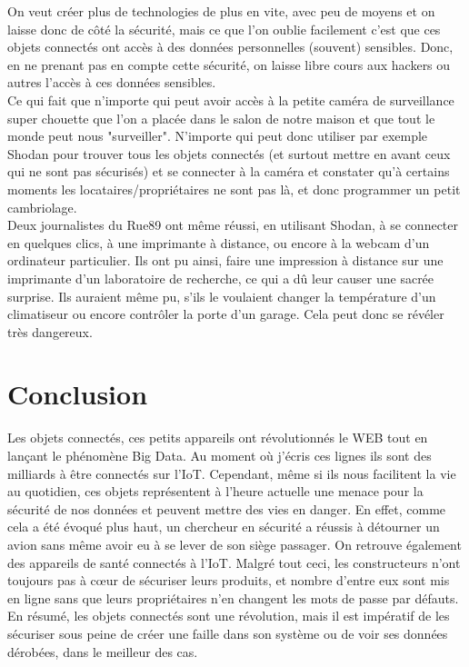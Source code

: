 \documentclass[a4paper]{report}
\begin{document}
	On veut créer plus de technologies de plus en vite, avec peu de moyens et on laisse donc de côté la sécurité, mais ce que l'on oublie facilement c'est que ces objets connectés ont accès à des données personnelles (souvent) sensibles. Donc, en ne prenant pas en compte cette sécurité, on laisse libre cours aux hackers ou autres l'accès à ces données sensibles. \\ 
	
	Ce qui fait que n'importe qui peut avoir accès à la petite caméra de surveillance super chouette que l'on a placée dans le salon de notre maison et que tout le monde peut nous "surveiller". N'importe qui peut donc utiliser par exemple Shodan pour trouver tous les objets connectés (et surtout mettre en avant ceux qui ne sont pas sécurisés) et se connecter à la caméra et constater qu'à certains moments les locataires/propriétaires ne sont pas là, et donc programmer un petit cambriolage.\\ 

	Deux journalistes du Rue89 ont même réussi, en utilisant Shodan, à se connecter en quelques clics, à une imprimante à distance, ou encore à la webcam d'un ordinateur particulier. Ils ont pu ainsi, faire une impression à distance sur une imprimante d'un laboratoire de recherche, ce qui a dû leur causer une sacrée surprise.
	Ils auraient même pu, s'ils le voulaient changer la température d'un climatiseur ou encore contrôler la porte d'un garage. Cela peut donc se révéler très dangereux. 	
	
	
	\section{Conclusion}
	
	Les objets connectés, ces petits appareils ont révolutionnés le WEB tout en lançant le phénomène Big Data. Au moment où j'écris ces
	lignes ils sont des milliards à être connectés sur l'IoT. Cependant, même si ils nous facilitent la vie au quotidien, ces objets
	représentent à l'heure actuelle une menace pour la sécurité de nos données et peuvent mettre des vies en danger. En effet, comme cela
	a été évoqué plus haut, un chercheur en sécurité a réussis à détourner un avion sans même avoir eu à se lever de son siège passager. On
	retrouve également des appareils de santé connectés à l'IoT. Malgré tout ceci, les constructeurs n'ont toujours pas à cœur de sécuriser
	leurs produits, et nombre d'entre eux sont mis en ligne sans que leurs propriétaires n'en changent les mots de passe par défauts.\\
	En résumé, les objets connectés sont une révolution, mais il est impératif de les sécuriser sous peine de créer une faille dans son système
	ou de voir ses données dérobées, dans le meilleur des cas.
	
\end{document}
